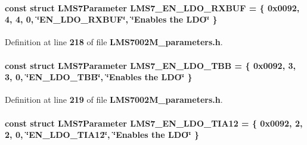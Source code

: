 \paragraph[{L\+M\+S7\+\_\+\+E\+N\+\_\+\+L\+D\+O\+\_\+\+R\+X\+B\+UF}]{\setlength{\rightskip}{0pt plus 5cm}const struct {\bf L\+M\+S7\+Parameter} L\+M\+S7\+\_\+\+E\+N\+\_\+\+L\+D\+O\+\_\+\+R\+X\+B\+UF = \{ 0x0092, 4, 4, 0, \char`\"{}\+E\+N\+\_\+\+L\+D\+O\+\_\+\+R\+X\+B\+U\+F\char`\"{}, \char`\"{}\+Enables the L\+D\+O\char`\"{} \}\hspace{0.3cm}{\ttfamily [static]}}\label{LMS7002M__parameters_8h_afbad267b7fe657102923b2944da12e37}


Definition at line {\bf 218} of file {\bf L\+M\+S7002\+M\+\_\+parameters.\+h}.

\paragraph[{L\+M\+S7\+\_\+\+E\+N\+\_\+\+L\+D\+O\+\_\+\+T\+BB}]{\setlength{\rightskip}{0pt plus 5cm}const struct {\bf L\+M\+S7\+Parameter} L\+M\+S7\+\_\+\+E\+N\+\_\+\+L\+D\+O\+\_\+\+T\+BB = \{ 0x0092, 3, 3, 0, \char`\"{}\+E\+N\+\_\+\+L\+D\+O\+\_\+\+T\+B\+B\char`\"{}, \char`\"{}\+Enables the L\+D\+O\char`\"{} \}\hspace{0.3cm}{\ttfamily [static]}}\label{LMS7002M__parameters_8h_ae7e55ac340653c4d836fb128a233382d}


Definition at line {\bf 219} of file {\bf L\+M\+S7002\+M\+\_\+parameters.\+h}.

\paragraph[{L\+M\+S7\+\_\+\+E\+N\+\_\+\+L\+D\+O\+\_\+\+T\+I\+A12}]{\setlength{\rightskip}{0pt plus 5cm}const struct {\bf L\+M\+S7\+Parameter} L\+M\+S7\+\_\+\+E\+N\+\_\+\+L\+D\+O\+\_\+\+T\+I\+A12 = \{ 0x0092, 2, 2, 0, \char`\"{}\+E\+N\+\_\+\+L\+D\+O\+\_\+\+T\+I\+A12\char`\"{}, \char`\"{}\+Enables the L\+D\+O\char`\"{} \}\hspace{0.3cm}{\ttfamily [static]}}\label{LMS7002M__parameters_8h_a2f6a51961128a3c3d5f5672118402c3c}


